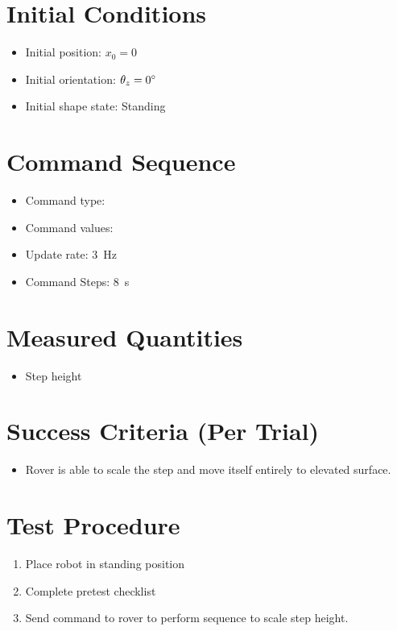 \documentclass[11pt]{article}
\begin{document}
\section*{Initial Conditions}
\begin{itemize}[noitemsep]
    \item Initial position: $x_0 = 0$
    \item Initial orientation: $\theta_z = 0 {\degree}$
    \item Initial shape state: Standing
\end{itemize}

\section*{Command Sequence}
\begin{itemize}[noitemsep]
    \item Command type: \underline{\hspace{5 cm}}
    \item Command values: \underline{\hspace{5 cm}}
    \item Update rate: 3~Hz
    \item Command Steps: 8~s
\end{itemize}

\section*{Measured Quantities}
\begin{itemize}[noitemsep]
    \item Step height
\end{itemize}

\section*{Success Criteria (Per Trial)}
\begin{itemize}[noitemsep]
    \item Rover is able to scale the step and move itself entirely to elevated surface.
\end{itemize}

\section*{Test Procedure}
\begin{enumerate}[noitemsep]
    \item Place robot in standing position
    \item Complete pretest checklist
    \item Send command to rover to perform sequence to scale step height.

\end{enumerate}
\end{document}
